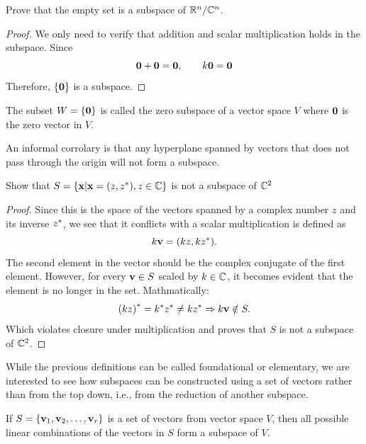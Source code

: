 \documentclass[12pt]{article}
\begin{document}
\begin{example}
    Prove that the empty set is a subspace of $\mathbb{R}^n/\mathbb{C}^n$. 
\end{example}

\begin{proof}
    We only need to verify that addition and scalar multiplication holds in the subspace. Since $$\mathbf{0} + \mathbf{0} = \mathbf{0}, \qquad k\mathbf{0} = \mathbf{0}$$
    Therefore, $\{\mathbf{0}\}$ is a subspace. 
\end{proof}

\begin{definition}
    The subset $W = \{\mathbf{0}\}$ is called the zero subspace of a vector space $V$ where $\mathbf{0}$ is the zero vector in $V$.
\end{definition}

An informal corrolary is that any hyperplane spanned by vectors that does not pass through the origin will not form a subspace. 

\begin{example}
    Show that $S = \{\mathbf{x} \vert \mathbf{x} = (z, {z}^*), z \in \mathbb{C}\}$ is not a subspace of $\mathbb{C}^2$
\end{example}

\begin{proof}
    Since this is the space of the vectors spanned by a complex number $z$ and its inverse ${z}^*$, we see that it conflicts with a scalar multiplication is defined as $$k \mathbf{v} = (kz, k {z}^*).$$
    The second element in the vector should be the complex conjugate of the first element. However, for every $\mathbf{v} \in S$ scaled by $k \in \mathbb{C}$, it becomes evident that the element is no longer in the set. Mathmatically: $${(kz)}^* = {k}^*{z}^* \neq k {z}^* \Rightarrow k \mathbf{v} \notin S.$$
    Which violates closure under multiplication and proves that $S$ is not a subspace of $\mathbb{C}^2$.
\end{proof}

While the previous definitions can be called foundational or elementary, we are interested to see how subspaces can be constructed using a set of vectors rather than from the top down, i.e., from the reduction of another subspace. 

\begin{theorem}
    If $S = \{\mathbf{v}_1, \mathbf{v}_2, \ldots, \mathbf{v}_r\}$ is a set of vectors from vector space $V$, then all possible linear combinations of the vectors in $S$ form a subspace of $V$. 
\end{theorem}
\end{document}
